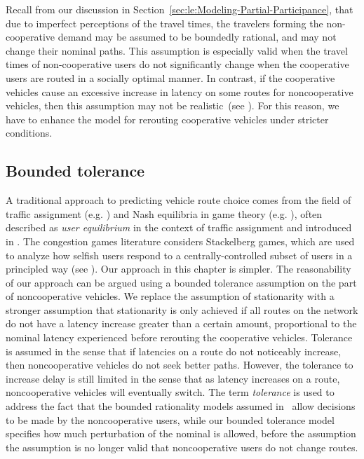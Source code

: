 Recall from our discussion in Section~\ref{sec:le:Modeling-Partial-Participance},
that due to imperfect perceptions of the travel times, the travelers
forming the non-cooperative demand may be assumed to be boundedly
rational, and may not change their nominal paths. This assumption
is especially valid when the travel times of non-cooperative users
do not significantly change when the cooperative users are routed
in a socially optimal manner. In contrast, if the cooperative vehicles
cause an excessive increase in latency on some routes for noncooperative
vehicles, then this assumption may not be realistic~(see \cite{aswani2011game,roughgarden2001stackelberg,6744679}).
For this reason, we have to enhance the model for rerouting cooperative
vehicles under stricter conditions.


\subsection{Bounded tolerance\label{sub:Motivating-limited-complacency}}

A traditional approach to predicting vehicle route choice comes from
the field of traffic assignment (e.g. \cite{wardrop1952some,lo2002cell,papageogiou1990})
and Nash equilibria in game theory (e.g. \cite{roughgarden2002bad,Papadimitriou2010}),
often described as \emph{user equilibrium} in the context of traffic
assignment and introduced in \cite{wardrop1952some}. The congestion
games literature considers Stackelberg games, which are used to analyze
how selfish users respond to a centrally-controlled subset of users
in a principled way (see \cite{Krichene2012,roughgarden2001stackelberg}).
Our approach in this chapter is simpler. The reasonability of our approach
can be argued using a bounded tolerance assumption on the part of
noncooperative vehicles. We replace the assumption of stationarity
with a stronger assumption that stationarity is only achieved if all
routes on the network do not have a latency increase greater than
a certain amount, proportional to the nominal latency experienced
before rerouting the cooperative vehicles. Tolerance is assumed in
the sense that if latencies on a route do not noticeably increase,
then noncooperative vehicles do not seek better paths. However, the
tolerance to increase delay is still limited in the sense that as
latency increases on a route, noncooperative vehicles will eventually
switch. The term \emph{tolerance }is used to address the fact that
the bounded rationality models assumed in~\cite{Hu199751,Guo2011}
allow decisions to be made by the noncooperative users, while our
bounded tolerance model specifies how much perturbation of the nominal
is allowed, before the assumption the assumption is no longer valid
that noncooperative users do not change routes.


